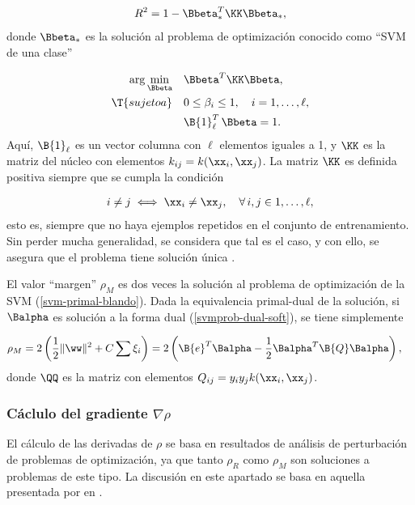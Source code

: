 \begin{align}
  R^2 = 1 - \Bbeta_*^T \KK \Bbeta_*,
\end{align}
donde $\Bbeta_*$ es la solución al problema de optimización conocido
como ``SVM de una clase'' \cite{scholkopf}

\begin{align}
\begin{split}
  \arg\min_{\Bbeta}\quad&\Bbeta^T \KK \Bbeta,\\
  \T{sujeto a}    \quad&0\leq\beta_i\leq{}1,\quad{}i=1,\ldots,\ell,\\
                       &\B{1}^T_\ell\,\Bbeta=1.
  \end{split}
  \label{svm-oneclass}
\end{align}
Aquí, $\B{1}_{\ell}$ es un vector columna con $\ell$ elementos iguales
a 1, y $\KK$ es la matriz del núcleo con elementos
$k_{ij}=k(\xx_i,\xx_j)$. La matriz $\KK$ es definida positiva siempre
que se cumpla la condición

\begin{align}
\label{cond-kmatrix-defpos}
  i\neq j \iff \xx_i\neq\xx_j,\quad \forall\,i,j\in{1,\ldots,\ell},
\end{align}
esto es, siempre que no haya ejemplos repetidos en el conjunto de
entrenamiento. Sin perder mucha generalidad, se considera que tal es
el caso, y con ello, se asegura que el problema \cite{svm-oneclass}
tiene solución única \cite{SOL-UNICA-DEFINIDA-POSITIVA}.

El valor ``margen'' $\rho_M$ es dos veces la solución al problema de
optimización de la SVM (\autoref{svm-primal-blando}).  Dada la
equivalencia primal-dual de la solución, si $\Balpha$ es solución a
la forma dual (\autoref{svmprob-dual-soft}), se tiene simplemente

\begin{align}
\label{prieqdual}
  \rho_M &= 2\left(\frac{1}{2}\|\ww\|^2+C\sum\xi_i \right)
  =2\left(\B{e}^T\Balpha-\frac{1}{2}\Balpha^T\B{Q}\Balpha\right),
\end{align}
donde $\QQ$ es la matriz con elementos $Q_{ij}=y_iy_jk(\xx_i,\xx_j)$.

\subsubsection{Cáclulo del gradiente $\nabla\rho$}
El cálculo de las derivadas de $\rho$ se basa en resultados de
análisis de perturbación de problemas de optimización, ya que tanto
$\rho_R$ como $\rho_M$ son soluciones a problemas de este tipo.  La
discusión en este apartado se basa en aquella presentada por
\citeauthor{chung} en \cite{chung}.

